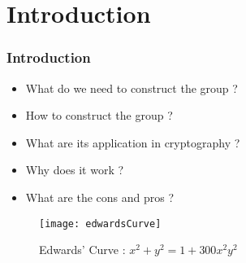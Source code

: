 \section{Introduction}


\begin{frame}[t]
    \frametitle{Introduction}

    \begin{minipage}[t]{0.5\linewidth}
    \begin{itemize}
        \item What do we need to construct the group ?
        \item How to construct the group ?
        \item What are its application in cryptography ?
        \item Why does it work ? 
        \item What are the cons and pros ?
    \end{itemize}
    \end{minipage}%
    \hfill%
    \begin{minipage}[t]{0.3\linewidth}
        \begin{figure}[h]
            \centering
            \texttt{[image: edwardsCurve]}
            \caption{Edwards' Curve : $x^2 + y^2 = 1 + 300x^2y^2$}
            \label{fig:edwardsCurve}
        \end{figure}
    \end{minipage}
\end{frame}

